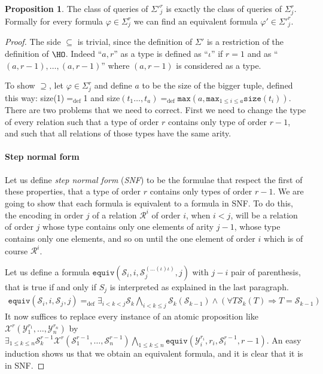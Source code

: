 \documentclass[a4paper,12pt]{article}
\newcommand{\emphdex}[1]{\index{#1}\emph{#1}}
\theoremstyle{definition}
\newtheorem{proposition}[theorem]{Proposition}
\renewcommand{\phi}{\varphi}
\newcommand{\hob}[2]{\ensuremath{\Sigma^{#1}_{#2}}}
\newcommand{\mc}{\mathcal}
\newcommand{\ed}{=_{\mathrm{def}}}
\begin{document}
\begin{proposition}
  The class of queries of $\Sigma'^{r}_{j}$ is exactly the class of
  queries of $\hob{r}{j}$. Formally for every formula
  $\phi\in\Sigma^{r}_{j}$ we can find an equivalent formula
  $\phi'\in\Sigma'^{r}_{j}$.
\end{proposition}
\begin{proof} The side $\subseteq$ is trivial, since the definition of
  $\Sigma'$ is a restriction of the definition of $\HO$. Indeed ``$a,r$'' as
  a type is defined as ``$\iota$'' if $r=1$ and as
  ``$(a,r-1),{\dots},(a,r-1)$'' where $(a,r-1)$ is considered as a
  type.

  To show $\supseteq$, let $\phi\in\hob{r}{j}$ and define $a$ to be
  the size of the bigger tuple, defined this way: size(1)$\ed$1 and
  size$(t_{1}\dots,t_{a})\ed\texttt{max}(a,\texttt{max}_{1\le i\le
    a}\texttt{size}(t_{i}))$. There are two problems that we need to
  correct. First we need to change the type of every relation such
  that a type of order $r$ contains only type of order $r-1$, and such
  that all relations of those types have the same arity.

  \paragraph{Step normal form}Let us define \emphdex{step normal form}
  (\emphdex{SNF}) to be the formulae that respect the first of these
  properties, that a type of order $r$ contains only types of order
  $r-1$.  We are going to show that each formula is equivalent to a
  formula in SNF. To do this, the encoding in order $j$ of a relation
  $\mc R^{i}$ of order $i$, when $i<j$, will be a relation of order
  $j$ whose type contains only one elements of arity $j-1$, whose type
  contains only one elements, and so on until the one element of order
  $i$ which is of course $\mc R^{i}$.

  Let us define a formula $\texttt{equiv}(\mc S_{i},i,\mc
  S_{j}^{(\dots(\iota)\iota)},j)$ with $j-i$ pair of parenthesis, that
  is true if and only if $S_{j}$ is interpreted  as explained in the
  last paragraph.
  \begin{eqnarray}
  \label{eq:equiv}
  \texttt{equiv}(\mc S_{i},i,\mc S_{j},j)\ed \exists_{i<k<
    j}\mc S_{k}\bigwedge_{i<k\le j}\mc S_{k}(\mc S_{k-1})\land(\forall T\mc S_{k}(T)\Rightarrow T=\mc S_{k-1})
\end{eqnarray}
It now suffices to replace every instance of an atomic proposition
like $\mc X^{r}(\mc Y_{1}^{r_{1}},\dots,\mc Y_{n}^{r_{n}})$ by
$\exists_{1\le k\le n}\mc S_{k}^{r-1}\mc X^{r}(\mc
S_{1}^{r-1},\dots,\mc S_{n}^{r-1})\bigwedge_{1\le k\le
  n}\texttt{equiv}(\mc Y_{i}^{r_{i}},r_{i},\mc S_{i}^{r-1},r-1)$.  An
easy induction shows us that we obtain an equivalent formula, and it
is clear that it is in SNF.


\end{proof}
\end{document}
